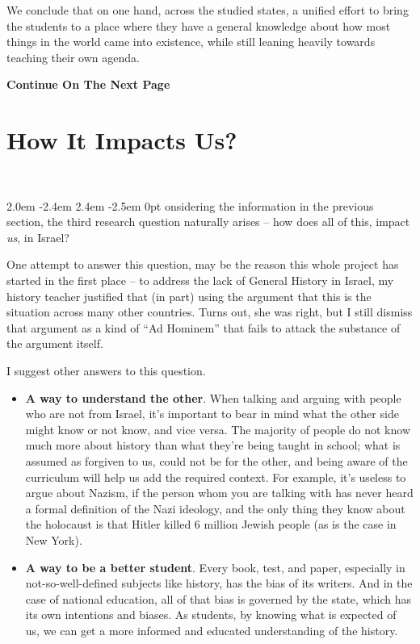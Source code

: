 \documentclass[12pt]{article}
\def\gothstart#1{\noindent\smash{\lower3ex\hbox{\llap{\Huge\gothfamily#1}}}
	\parshape=3 2.0em \dimexpr\hsize-2.4em 2.4em \dimexpr\hsize-2.5em 0pt \hsize}
\newcommand\aftertitle{\ \!\!\!\!\!\!\!\!\!\!}
\newcommand \npage {\vfil {\hfil \textbf{\footnotesize {Continue On The Next Page}}} \hfil \vfil \pagebreak}
\begin{document}
	We conclude that on one hand, across the studied states, a unified effort to bring the students to a place where they have a general knowledge about how most things in the world came into existence, while still leaning heavily towards teaching their own agenda. 
	
	\npage
	\section{How It Impacts Us?}\aftertitle
	
	\gothstart Considering the information in the previous section, the third research question naturally arises -- how does all of this, impact \textit{us}, in Israel? 
	
	One attempt to answer this question, may be the reason this whole project has started in the first place -- to address the lack of General History in Israel, my history teacher justified that (in part) using the argument that this is the situation across many other countries. Turns out, she was right, but I still dismiss that argument as a kind of ``Ad Hominem'' that fails to attack the substance of the argument itself. 
	
	I suggest other answers to this question. 
	\begin{itemize}
		\item \textbf{A way to understand the other}. When talking and arguing with people who are not from Israel, it's important to bear in mind what the other side might know or not know, and vice versa. The majority of people do not know much more about history than what they're being taught in school; what is assumed as forgiven to us, could not be for the other, and being aware of the curriculum will help us add the required context. For example, it's useless to argue about Nazism, if the person whom you are talking with has never heard a formal definition of the Nazi ideology, and the only thing they know about the holocaust is that Hitler killed 6 million Jewish people (as is the case in New York). 
		\item \textbf{A way to be a better student}. Every book, test, and paper, especially in not-so-well-defined subjects like history, has the bias of its writers. And in the case of national education, all of that bias is governed by the state, which has its own intentions and biases. As students, by knowing what is expected of us, we can get a more informed and educated understanding of the history. 
	\end{itemize}
	
\end{document}
